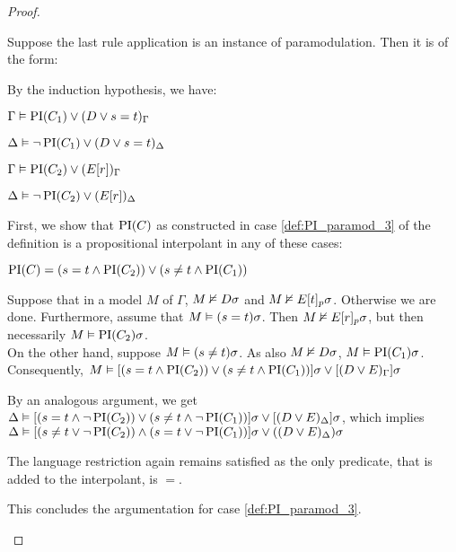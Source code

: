 \begin{proof}
\begin{indproof}
			Suppose the last rule application is an instance of paramodulation. Then it is of the form:
			\begin{prooftree}
			\end{prooftree}


			By the induction hypothesis, we have:

			$\Gamma \vDash \operatorname{PI}(C_1) \lor (D\lor s=t)_\Gamma$

			$\Delta \vDash \lnot \operatorname{PI}(C_1) \lor (D\lor s=t)_\Delta$

			$\Gamma \vDash \operatorname{PI}(C_2) \lor (E[r])_\Gamma$

			$\Delta \vDash \lnot \operatorname{PI}(C_2) \lor (E[r])_\Delta$

			First, we show that $\operatorname{PI}(C)$ as constructed in case \ref{def:PI_paramod_3} of the definition is a propositional interpolant in any of these cases:

			$\operatorname{PI}(C) = (s=t \land \operatorname{PI}(C_2)) \lor (s\neq t \land \operatorname{PI}(C_1)) $

			Suppose that in a model $M$ of $\Gamma$, $M \nvDash D\sigma$ and $M \nvDash E{[t]_{p}}\sigma$. Otherwise we are done.
			Furthermore, assume that $M \vDash (s=t)\sigma$. Then $M \nvDash E{[r]_{p}}\sigma$, but then necessarily $M \vDash \operatorname{PI}(C_2)\sigma$. \\
			On the other hand, suppose $M \vDash (s\neq t)\sigma$. As also $M \nvDash D\sigma$, $M \vDash \operatorname{PI}(C_1)\sigma$.
			Consequently, $M \vDash [(s=t \land \operatorname{PI}(C_2)) \lor (s\neq t \land \operatorname{PI}(C_1))]\sigma \lor [(D \lor E)_\Gamma]\sigma$

			By an analogous argument, we get $\Delta \vDash [(s=t \land \lnot \operatorname{PI}(C_2)) \lor (s\neq t \land \lnot \operatorname{PI}(C_1))]\sigma \lor [(D \lor E)_\Delta]\sigma$,
			which implies
			$\Delta \vDash [( s\neq t \lor \lnot \operatorname{PI}(C_2)) \land (s = t \lor \lnot \operatorname{PI}(C_1))]\sigma \lor ((D \lor E)_\Delta)\sigma $


			The language restriction again remains satisfied as the only predicate, that is added to the interpolant, is $=$.

			This concludes the argumentation for case \ref{def:PI_paramod_3}. 


\end{indproof}
\end{proof}
